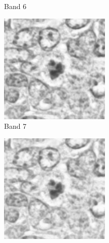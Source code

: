\documentclass[10pt,twocolumn,letterpaper]{article}
\begin{document}
\begin{figure}[t]
\begin{subfigure}[b]{0.11\textwidth}
		\caption*{Band 6}
	\end{subfigure}
	\begin{subfigure}[b]{0.11\textwidth}
		\centering
		\includegraphics[width=\textwidth]{img/M03_00a_0706_m1.png}
		\caption*{Band 7}
	\end{subfigure}
	\begin{subfigure}[b]{0.11\textwidth}
		\centering
		\includegraphics[width=\textwidth]{img/M03_00a_0807_m1.png}

\end{subfigure}
\end{figure}
\end{document}
